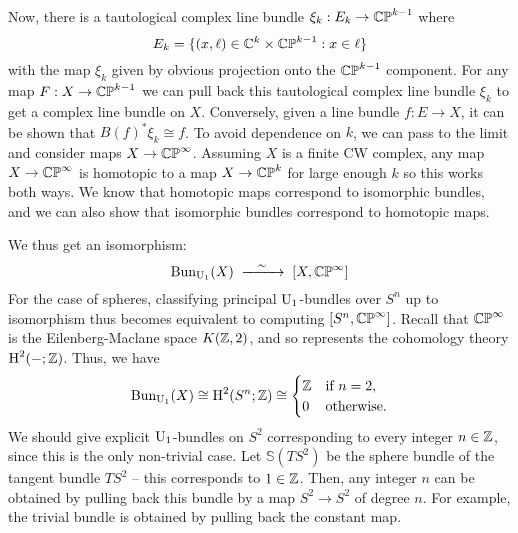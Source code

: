 \documentclass{../../templates/lkx_pset}
\begin{document}
\begin{parts}
	Now, there is a tautological complex line bundle $\xi_k : E_k \to \mathbb{CP}^{k-1}$ where
	\[
		E_k = \{ (x,\ell) \in \mathbb{C}^k\times \mathbb{CP}^{k-1} : x\in \ell\}
	\]
	with the map $\xi_k$ given by obvious projection onto the $\mathbb{CP}^{k-1}$ component. For any map $F : X \to \mathbb{CP}^{k-1}$ we can pull back this tautological complex line bundle $\xi_k$ to get a complex line bundle on $X$. Conversely, given a line bundle $f : E \to X$, it can be shown that $B(f)^* \xi_k \cong f$. To avoid dependence on $k$, we can pass to the limit and consider maps $X \to \mathbb{CP}^{\infty}$. Assuming $X$ is a finite CW complex, any map $X \to \mathbb{CP}^\infty$ is homotopic to a map $X \to \mathbb{CP}^k$ for large enough $k$ so this works both ways. We know that homotopic maps correspond to isomorphic bundles, and we can also show that isomorphic bundles correspond to homotopic maps.

	We thus get an isomorphism:
	\[
		\textrm{Bun}_{\U_1}(X) \lkxisom[] [X, \CP^\infty]
	\]
	For the case of spheres, classifying principal $\operatorname{U}_1$-bundles over $S^n$ up to isomorphism thus becomes equivalent to computing $[S^n, \mathbb{CP}^\infty]$. Recall that $\mathbb{CP}^\infty$ is the Eilenberg-Maclane space $K(\mathbb{Z}, 2)$, and so represents the cohomology theory $\textrm{H}^2(-; \mathbb{Z})$. Thus, we have
	\[
		\textrm{Bun}_{\operatorname{U}_1}(X) \cong \textrm{H}^2(S^n; \mathbb{Z})\cong \begin{cases}\mathbb{Z} & \textrm{if }n=2,    \\
             0  & \textrm{otherwise}.\end{cases}
	\]
	We should give explicit $\operatorname{U}_1$-bundles on $S^2$ corresponding to every integer $n\in \mathbb{Z}$, since this is the only non-trivial case. Let $\mathbb{S}(TS^2)$ be the sphere bundle of the tangent bundle $TS^2$ -- this corresponds to $1\in \mathbb{Z}$. Then, any integer $n$ can be obtained by pulling back this bundle by a map $S^2 \to S^2$ of degree $n$. For example, the trivial bundle is obtained by pulling back the constant map.
\end{parts}
\end{document}
